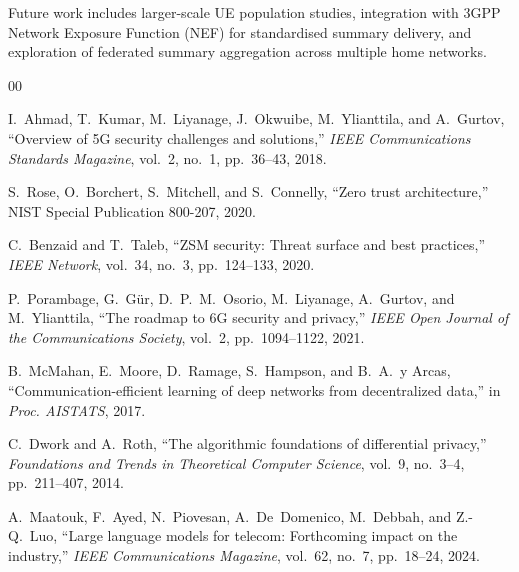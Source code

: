 \documentclass[conference]{IEEEtran}
\begin{document}
Future work includes larger-scale UE population studies, integration with 3GPP Network Exposure Function (NEF) for standardised summary delivery, and exploration of federated summary aggregation across multiple home networks.



% 

\begin{thebibliography}{00}

I.~Ahmad, T.~Kumar, M.~Liyanage, J.~Okwuibe, M.~Ylianttila, and A.~Gurtov, ``Overview of 5G security challenges and solutions,'' \textit{IEEE Communications Standards Magazine}, vol.~2, no.~1, pp.~36--43, 2018.

S.~Rose, O.~Borchert, S.~Mitchell, and S.~Connelly, ``Zero trust architecture,'' NIST Special Publication 800-207, 2020.

C.~Benzaid and T.~Taleb, ``ZSM security: Threat surface and best practices,'' \textit{IEEE Network}, vol.~34, no.~3, pp.~124--133, 2020.

P.~Porambage, G.~Gür, D.~P.~M.~Osorio, M.~Liyanage, A.~Gurtov, and M.~Ylianttila, ``The roadmap to 6G security and privacy,'' \textit{IEEE Open Journal of the Communications Society}, vol.~2, pp.~1094--1122, 2021.

B.~McMahan, E.~Moore, D.~Ramage, S.~Hampson, and B.~A.~y Arcas, ``Communication-efficient learning of deep networks from decentralized data,'' in \textit{Proc. AISTATS}, 2017.

C.~Dwork and A.~Roth, ``The algorithmic foundations of differential privacy,'' \textit{Foundations and Trends in Theoretical Computer Science}, vol.~9, no.~3--4, pp.~211--407, 2014.

A.~Maatouk, F.~Ayed, N.~Piovesan, A.~De~Domenico, M.~Debbah, and Z.-Q.~Luo, ``Large language models for telecom: Forthcoming impact on the industry,'' \textit{IEEE Communications Magazine}, vol.~62, no.~7, pp.~18--24, 2024.


\end{thebibliography}
\end{document}
